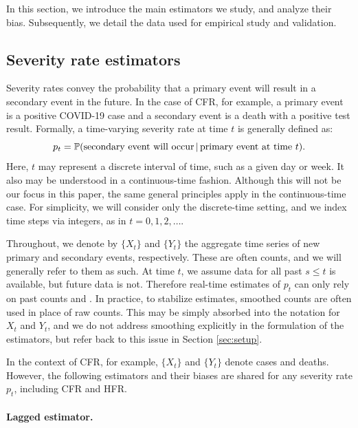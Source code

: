 \documentclass{article}
\newcommand{\given}{\, \vert \,}
\begin{document}
In this section, we introduce the main estimators we study, and analyze their 
bias. 
Subsequently, we detail the data used for empirical study and validation. 

\subsection{Severity rate estimators}
\label{sec:defs}

Severity rates convey the probability that a primary event will result in a
secondary event in the future. In the case of CFR, for example, a primary event
is a positive COVID-19 case and a secondary event is a death with a positive
test result. Formally, a time-varying severity rate at time $t$ is generally
defined as:  
\begin{equation}
\label{eq:severity}
p_t = \P(\text{secondary event will occur} \given \text{primary event at time 
  $t$}).   
\end{equation}
Here, $t$ may represent a discrete interval of time, such as a given day or 
week. It also may be understood in a continuous-time fashion. Although this will    
not be our focus in this paper, the same general principles apply in the
continuous-time case. For simplicity, we will consider only the discrete-time 
setting, and we index time steps via integers, as in $t=0,1,2,\dots$.    

Throughout, we denote by $\{X_t\}$ and $\{Y_t\}$ the aggregate time series of 
new primary and secondary events, respectively. These are often counts, and we
will generally refer to them as such. At time $t$, we assume data for all past
$s \leq t$ is available, but future data is not. Therefore real-time estimates of
$p_t$ can only rely on past counts  and
. In practice, to stabilize estimates, smoothed
counts are often used in place of raw counts. This may be simply absorbed into 
the notation for $X_t$ and $Y_t$, and we do not address smoothing explicitly in
the formulation of the estimators, but refer back to this issue in Section
\ref{sec:setup}.  

In the context of CFR, for example, $\{X_t\}$ and $\{Y_t\}$ denote cases and deaths.
However, the following estimators and their biases are shared for any severity rate $p_t$, including CFR and HFR. %

\paragraph{Lagged estimator.} 
\end{document}
